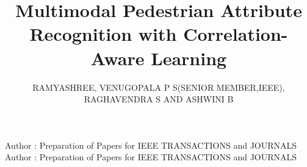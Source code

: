 \documentclass{ieeeaccess}
\begin{document}

\title{Multimodal Pedestrian Attribute Recognition with Correlation-Aware Learning
}

\author{\uppercase{Ramyashree},
\uppercase{ Venugopala P S(Senior Member,IEEE), Raghavendra S and Ashwini B}
}
\address[1]{  Department of    Information and Communication Technology, Manipal Institute of Technology,Manipal Academy of Higher Education, Manipal,576104, India  (e-mail:   ramya.shree@manipal.edu,raghavendra.s@manipal.edu)}
\address[2]{Member, IEEE, NITTE (Deemed to be University), NMAM Institute of Technology, Nitte 574110, Karnataka, India}
\address[3]{NITTE (Deemed to be University), Department of Artificial Intelligence and Data Science, NMAM Institute of Technology, Nitte - 574110, Karnataka, India(e-mail: venugopalaps@nitte.edu.in )}
\address[4]{NITTE (Deemed to be University),Department of Information Science \& Engineering , NMAM Institute of Technology, Nitte - 574110, Karnataka, India(e-mail: ashwinib@nitte.edu.in )}

\markboth
{Author \headeretal: Preparation of Papers for IEEE TRANSACTIONS and JOURNALS}
{Author \headeretal: Preparation of Papers for IEEE TRANSACTIONS and JOURNALS}

\end{document}
